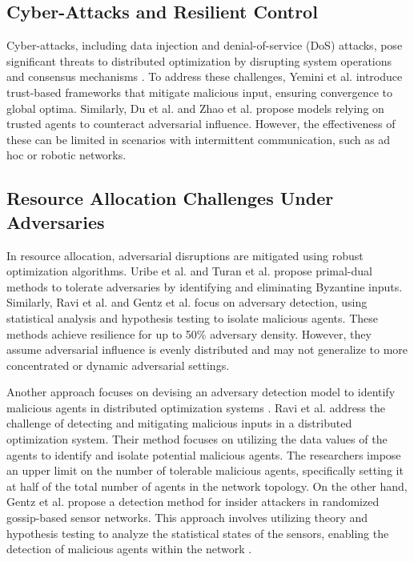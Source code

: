 \documentclass[journal]{IEEEtran}
\begin{document}
\subsection{Cyber-Attacks and Resilient Control}
Cyber-attacks, including data injection and denial-of-service (DoS) attacks, pose significant threats to distributed optimization by disrupting system operations and consensus mechanisms \cite{ishii2022overview}. To address these challenges, Yemini et al. \cite{yemini2022resilience} introduce trust-based frameworks that mitigate malicious input, ensuring convergence to global optima. Similarly, Du et al. \cite{du2023distributed} and Zhao et al. \cite{zhao2019resilient} propose models relying on trusted agents to counteract adversarial influence. However, the effectiveness of these can be limited in scenarios with intermittent communication, such as ad hoc or robotic networks.

\subsection{Resource Allocation Challenges Under Adversaries}
In resource allocation, adversarial disruptions are mitigated using robust optimization algorithms. Uribe et al. \cite{uribe2019resilient} and Turan et al. \cite{turan2020resilient} propose primal-dual methods to tolerate adversaries by identifying and eliminating Byzantine inputs. Similarly, Ravi et al. \cite{ravi2019case} and Gentz et al. \cite{gentz2016data} focus on adversary detection, using statistical analysis and hypothesis testing to isolate malicious agents. These methods achieve resilience for up to 50\% adversary density. However, they assume adversarial influence is evenly distributed and may not generalize to more concentrated or dynamic adversarial settings.
 
Another approach focuses on devising an adversary detection model to identify malicious agents in distributed optimization systems \cite{ravi2019case, gentz2016data}. Ravi et al. \cite{ravi2019case} address the challenge of detecting and mitigating malicious inputs in a distributed optimization system. Their method focuses on utilizing the data values of the agents to identify and isolate potential malicious agents. The researchers impose an upper limit on the number of tolerable malicious agents, specifically setting it at half of the total number of agents in the network topology. On the other hand, Gentz et al. propose a detection method for insider attackers in randomized gossip-based sensor networks. This approach involves utilizing theory and hypothesis testing to analyze the statistical states of the sensors, enabling the detection of malicious agents within the network \cite{gentz2016data}.
\end{document}
